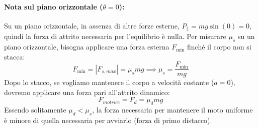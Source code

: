 \paragraph{Nota sul piano orizzontale ($\theta = 0$):}
Su un piano orizzontale, in assenza di altre forze esterne, $P_{\parallel} = m g \sin(0) = 0$, quindi la forza di attrito necessaria per l'equilibrio è nulla.
Per misurare $\mu_s$ su un piano orizzontale, bisogna applicare una forza esterna $F_{\text{min}}$ finché il corpo non si stacca:
\begin{equation}
    F_{\text{min}} = |F_{s,max}| = \mu_s m g \implies \mu_s = \frac{F_{\text{min}}}{m g}
\end{equation}
Dopo lo stacco, se vogliamo mantenere il corpo a velocità costante ($a=0$), dovremo applicare una forza pari all'attrito dinamico: 
\begin{equation}
    F_{motrice} = F_d = \mu_d m g
\end{equation}
Essendo solitamente $\mu_d < \mu_s$, la forza necessaria per mantenere il moto uniforme è minore di quella necessaria per avviarlo (forza di primo distacco).

